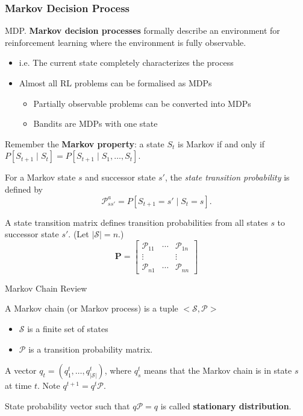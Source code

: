 \documentclass[english]{article}
\begin{document}
\eenum

\subsubsection{Markov Decision Process}
\benum

\item {MDP}.
\textbf{Markov decision processes} formally describe an environment
for reinforcement learning where the environment is fully observable.
\begin{itemize}
    \item i.e. The current state completely characterizes the process
    \item Almost all RL problems can be formalised as MDPs
    \begin{itemize}
        \item Partially observable problems can be converted into MDPs
        \item Bandits are MDPs with one state
    \end{itemize}
\end{itemize}


Remember the \textbf{Markov property}: a state $S_t$ is Markov if and only if $P[S_{t+1} \mid S_t] = P[S_{t+1} \mid S_1,\dots,S_t]$.

\medskip
For a Markov state $s$ and successor state $s'$, the \textit{state transition probability} is defined by
\[ \mathcal{P}_{s s'}^a = P[S_{t+1} = s' \mid S_t = s]. \]

A state transition matrix defines transition probabilities from all states $s$ to successor state $s'$. (Let $|\mathcal{S}| = n$.)
\[ \mathcal{\bm P} = \begin{bmatrix} \mathcal{P}_{11} &\cdots &\mathcal{P}_{1n} \\ \vdots && \vdots \\ \mathcal{P}_{n1} &\cdots &\mathcal{P}_{nn} \end{bmatrix} \]



\item {Markov Chain Review}
\begin{definition}
A Markov chain (or Markov process) is a tuple $<\mathcal{S},\mathcal{P}>$
\begin{itemize}
    \item $\mathcal{S}$ is a finite set of states
    \item $\mathcal{P}$ is a transition probability matrix.
\end{itemize}
\end{definition}
\begin{definition}
A vector $q_t = (q_1^t, \dots, q_{|\mathcal{S}|}^t)$, where $q_s^t$ means that the Markov chain is in state $s$ at time $t$. Note $q^{t+1} = q^t \mathcal{P}$.

\medskip
State probability vector such that $q \mathcal{P} = q$ is called \textbf{stationary distribution}.
\end{definition}
\end{document}
